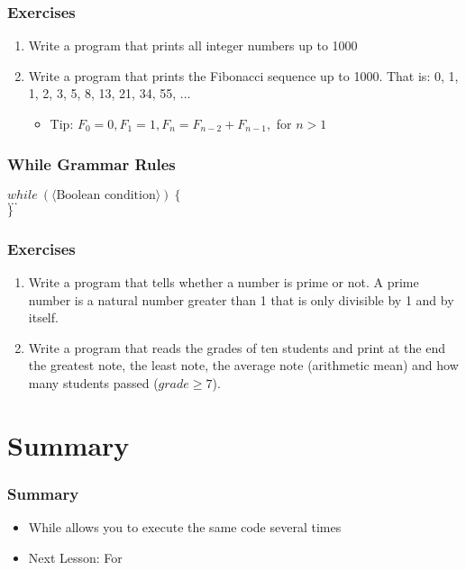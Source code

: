 \documentclass{beamer}
\newcommand{\cindent}{\hskip20pt}
\begin{document}
	\begin{frame}
		\frametitle{Exercises}
		\begin{enumerate}
			\item Write a program that prints all integer numbers up to 1000
			\pause
			\item Write a program that prints the Fibonacci sequence up to 1000. That is: 0, 1, 1, 2, 3, 5, 8, 13, 21, 34, 55, ... 
			\pause
			\begin{itemize}
				\item Tip: $F_0 = 0, F_1 = 1, F_n = F_{n-2} + F_{n-1},$ for $n > 1$
			\end{itemize}
		\end{enumerate}
	\end{frame}

	\begin{frame}
		\frametitle{While Grammar Rules}
		$while\ (\langle \text{Boolean condition} \rangle)\ \{$\\
			\cindent $...$\\
		$\}$\\
	\end{frame}

	\begin{frame}
		\frametitle{Exercises}
		\begin{enumerate}
			\item Write a program that tells whether a number is prime or not. A prime number is a natural number greater than 1 that is only divisible by 1 and by itself.
			\pause
			\item Write a program that reads the grades of ten students and print at the end the greatest note, the least note, the average note (arithmetic mean) and how many students passed ($grade \ge 7$).
		\end{enumerate}
	\end{frame}
		
	\section{Summary}
	
	\begin{frame}
		\frametitle{Summary}
		\begin{itemize}
			\item While allows you to execute the same code several times
			\item Next Lesson: For
		\end{itemize}
	\end{frame}
\end{document}
